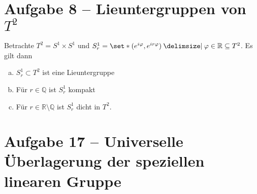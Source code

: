\section{Aufgabe 8 -- Lieuntergruppen von $T^2$} %
\label{sec:aufg8}
Betrachte $T^2= S^1 \times S^1$ und $S^1_r = \set*{(e^{i \varphi}, e^{i r \varphi}) \given \varphi \in \mathbb{R}} \subseteq T^2$.
Es gilt dann
\begin{enumerate}[a)]
	\item $S^1_r \subset T^2$ ist eine Lieuntergruppe
	\item Für $r \in \mathbb{Q}$ ist $S^1_r$ kompakt
	\item Für $r \in \mathbb{R} \setminus \mathbb{Q}$ ist $S^1_r$ dicht in $T^2$.
\end{enumerate}
\begin{beweis}
\end{beweis}

\section{Aufgabe 17 -- Universelle Überlagerung der speziellen linearen Gruppe} %
\label{sec:aufg17}












